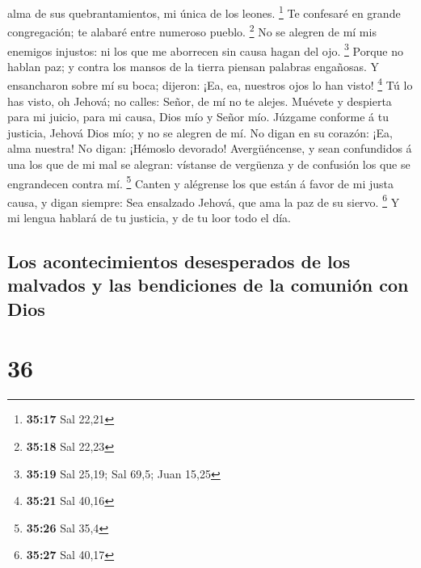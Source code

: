 alma de sus quebrantamientos, mi única de los leones. \footnote{\textbf{35:17}
  Sal 22,21}  Te confesaré en grande congregación; te
alabaré entre numeroso pueblo. \footnote{\textbf{35:18} Sal 22,23}
 No se alegren de mí mis enemigos injustos: ni los que me
aborrecen sin causa hagan del ojo. \footnote{\textbf{35:19} Sal 25,19;
  Sal 69,5; Juan 15,25}  Porque no hablan paz; y contra los
mansos de la tierra piensan palabras engañosas.  Y
ensancharon sobre mí su boca; dijeron: ¡Ea, ea, nuestros ojos lo han
visto! \footnote{\textbf{35:21} Sal 40,16}  Tú lo has
visto, oh Jehová; no calles: Señor, de mí no te alejes. 
Muévete y despierta para mi juicio, para mi causa, Dios mío y Señor mío.
 Júzgame conforme á tu justicia, Jehová Dios mío; y no se
alegren de mí.  No digan en su corazón: ¡Ea, alma nuestra!
No digan: ¡Hémoslo devorado!  Avergüéncense, y sean
confundidos á una los que de mi mal se alegran: vístanse de vergüenza y
de confusión los que se engrandecen contra mí. \footnote{\textbf{35:26}
  Sal 35,4}  Canten y alégrense los que están á favor de mi
justa causa, y digan siempre: Sea ensalzado Jehová, que ama la paz de su
siervo. \footnote{\textbf{35:27} Sal 40,17}  Y mi lengua
hablará de tu justicia, y de tu loor todo el día.

\hypertarget{los-acontecimientos-desesperados-de-los-malvados-y-las-bendiciones-de-la-comuniuxf3n-con-dios}{%
\subsection{Los acontecimientos desesperados de los malvados y las
bendiciones de la comunión con
Dios}\label{los-acontecimientos-desesperados-de-los-malvados-y-las-bendiciones-de-la-comuniuxf3n-con-dios}}

\hypertarget{section-35}{%
\section{36}\label{section-35}}

